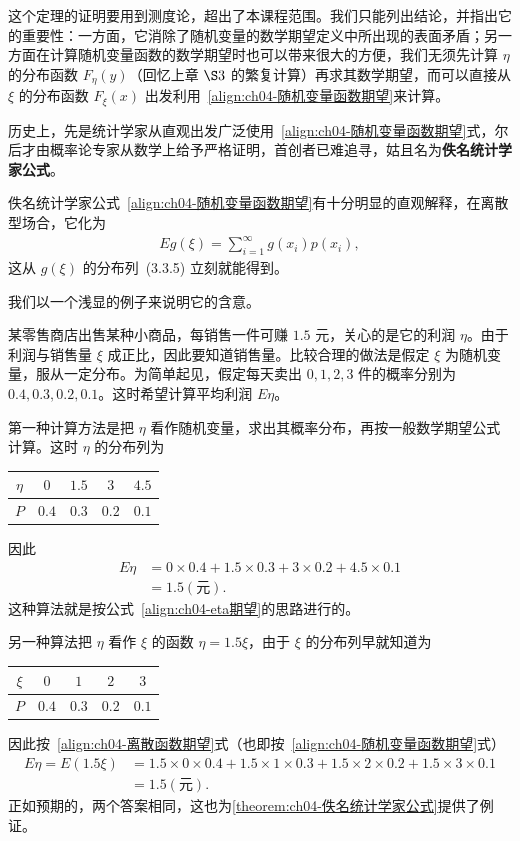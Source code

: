 \documentclass[../../main.tex]{subfiles}
\begin{document}
这个定理的证明要用到测度论，超出了本课程范围。我们只能列出结论，并指出它的重要性：一方面，它消除了随机变量的数学期望定义中所出现的表面矛盾；另一方面在计算随机变量函数的数学期望时也可以带来很大的方便，我们无须先计算 $\eta$ 的分布函数 $F_\eta(y)$（回忆上章 $\S 3$ 的繁复计算）再求其数学期望，而可以直接从 $\xi$ 的分布函数 $F_\xi(x)$ 出发利用~\eqref{align:ch04-随机变量函数期望}来计算。

历史上，先是统计学家从直观出发广泛使用~\eqref{align:ch04-随机变量函数期望}式，尔后才由概率论专家从数学上给予严格证明，首创者已难追寻，姑且名为\textbf{佚名统计学家公式}。

佚名统计学家公式~\eqref{align:ch04-随机变量函数期望}有十分明显的直观解释，在离散型场合，它化为
\begin{align}
Eg(\xi)=\sum_{i=1}^{\infty} g(x_i)p(x_i),\label{align:ch04-离散函数期望}
\end{align}
这从 $g(\xi)$ 的分布列~(3.3.5) 立刻就能得到。

我们以一个浅显的例子来说明它的含意。

某零售商店出售某种小商品，每销售一件可赚 $1.5$ 元，关心的是它的利润 $\eta$。由于利润与销售量 $\xi$ 成正比，因此要知道销售量。比较合理的做法是假定 $\xi$ 为随机变量，服从一定分布。为简单起见，假定每天卖出 $0,1,2,3$ 件的概率分别为 $0.4,0.3,0.2,0.1$。这时希望计算平均利润 $E\eta$。

第一种计算方法是把 $\eta$ 看作随机变量，求出其概率分布，再按一般数学期望公式计算。这时 $\eta$ 的分布列为
\begin{center}
\begin{tabular}{c|cccc}
$\eta$ & $0$ & $1.5$ & $3$ & $4.5$\\
\hline
$P$ & $0.4$ & $0.3$ & $0.2$ & $0.1$
\end{tabular}
\end{center}
因此
\begin{align*}
E\eta&=0\times 0.4+1.5\times 0.3+3\times 0.2+4.5\times 0.1\\
&=1.5(\text{元}).
\end{align*}
这种算法就是按公式~\eqref{align:ch04-eta期望}的思路进行的。

另一种算法把 $\eta$ 看作 $\xi$ 的函数 $\eta=1.5\xi$，由于 $\xi$ 的分布列早就知道为
\begin{center}
\begin{tabular}{c|cccc}
$\xi$ & $0$ & $1$ & $2$ & $3$\\
\hline
$P$ & $0.4$ & $0.3$ & $0.2$ & $0.1$
\end{tabular}
\end{center}
因此按~\eqref{align:ch04-离散函数期望}式（也即按~\eqref{align:ch04-随机变量函数期望}式）
\begin{align*}
E\eta=E(1.5\xi)&=1.5\times 0\times 0.4+1.5\times 1\times 0.3+1.5\times 2\times 0.2+1.5\times 3\times 0.1\\
&=1.5(\text{元}).
\end{align*}
正如预期的，两个答案相同，这也为\cref{theorem:ch04-佚名统计学家公式}提供了例证。
\end{document}

